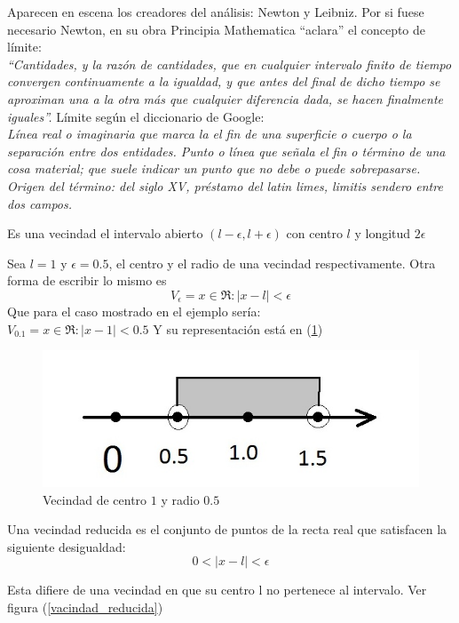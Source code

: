 \documentclass[10pt,twoside]{SelfArx} %
\begin{document}
Aparecen en escena los creadores del análisis: Newton y Leibniz.
Por si fuese necesario Newton, en su obra Principia Mathematica “aclara” el concepto de límite:\\
\textit{“Cantidades, y la razón de cantidades, que en cualquier intervalo  finito de tiempo convergen continuamente a la igualdad, y que antes del final de dicho tiempo se aproximan una a la otra más que cualquier diferencia dada, se hacen finalmente iguales”.}
Límite según el diccionario de Google:\\
\textit{
Línea real o imaginaria que marca la el fin de una superficie o cuerpo o la separación entre dos entidades.
Punto o línea que señala el fin o término de una cosa material; que suele indicar un punto que no debe o puede sobrepasarse.
Origen del término: del siglo XV, préstamo del latin limes, limitis sendero entre dos campos.}\\

\begin{thm}\label{vecindad}
Es una vecindad el intervalo abierto $ (l-\epsilon, l+\epsilon) $ con centro $ l $ y longitud $ 2\epsilon $
\end{thm}
\begin{ejemplo}
Sea $ l=1 $ y $ \epsilon=0.5 $, el centro y el radio de una vecindad respectivamente.
Otra forma de escribir lo mismo es 
\[ V_{\epsilon}={x\in\Re: |x-l|<\epsilon} \]
Que para el caso mostrado en el ejemplo sería:\\
$  V_{0.1}={x\in\Re:|x-1|<0.5}  $
Y su representaci\'on est\'a en (\ref{vecindad_im1})

\end{ejemplo}
\begin{figure}[h]
\centering
\includegraphics{vecindad}
\caption{Vecindad de centro $ 1 $ y radio $ 0.5 $}
\label{vecindad_im1}
\end{figure}
\newpage



\begin{thm}\label{vacindad_reducida}
	Una vecindad reducida es el conjunto de puntos de la recta real que satisfacen la siguiente desigualdad:\\
	\[ 0<|x-l|<\epsilon\]
		 
		 
\end{thm}
	Esta difiere de una vecindad en que su centro l no pertenece al intervalo. Ver figura (\ref{vacindad_reducida})
\end{document}
